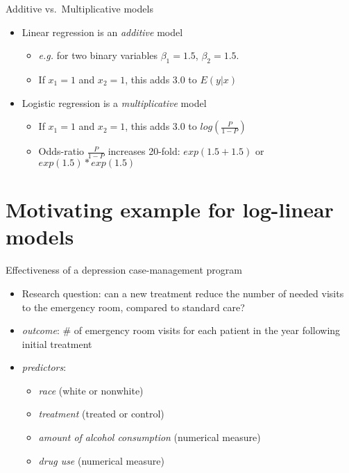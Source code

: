 \documentclass[ignorenonframetext,]{beamer}
\providecommand{\tightlist}{%
  \setlength{\itemsep}{0pt}\setlength{\parskip}{0pt}}
\begin{document}
\begin{frame}{Additive vs.~Multiplicative models}
\protect\hypertarget{additive-vs.multiplicative-models}{}

\begin{itemize}
\tightlist
\item
  Linear regression is an \emph{additive} model

  \begin{itemize}
  \tightlist
  \item
    \emph{e.g.} for two binary variables \(\beta_1 = 1.5\),
    \(\beta_2 = 1.5\).
  \item
    If \(x_1=1\) and \(x_2=1\), this adds 3.0 to \(E(y|x)\)
  \end{itemize}
\item
  Logistic regression is a \emph{multiplicative} model

  \begin{itemize}
  \tightlist
  \item
    If \(x_1=1\) and \(x_2=1\), this adds 3.0 to \(log(\frac{P}{1-P})\)
  \item
    Odds-ratio \(\frac{P}{1-P}\) increases 20-fold: \(exp(1.5+1.5)\) or
    \(exp(1.5) * exp(1.5)\)
  \end{itemize}
\end{itemize}

\end{frame}

\hypertarget{motivating-example-for-log-linear-models}{%
\section{Motivating example for log-linear
models}\label{motivating-example-for-log-linear-models}}

\begin{frame}{Effectiveness of a depression case-management program}
\protect\hypertarget{effectiveness-of-a-depression-case-management-program}{}

\begin{itemize}
\tightlist
\item
  Research question: can a new treatment reduce the number of needed
  visits to the emergency room, compared to standard care?
\item
  \emph{outcome}: \# of emergency room visits for each patient in the
  year following initial treatment
\item
  \emph{predictors}:

  \begin{itemize}
  \tightlist
  \item
    \emph{race} (white or nonwhite)
  \item
    \emph{treatment} (treated or control)
  \item
    \emph{amount of alcohol consumption} (numerical measure)
  \item
    \emph{drug use} (numerical measure)
  \end{itemize}
\end{itemize}

\end{frame}
\end{document}

